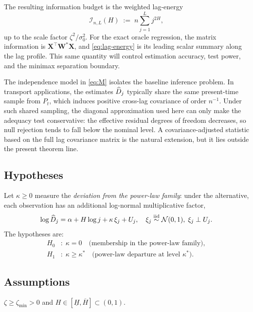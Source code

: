 The resulting information budget is the weighted lag-energy
\begin{equation}
    \mathcal I_{n,L}(H)
    \;:=\;
    n \sum_{j=1}^L j^{2H},
    \label{eq:lag-energy}
\end{equation}
up to the scale factor $\zeta^2/\sigma_0^2$.  For the exact oracle regression,
the matrix information is $\mathbf X^\top \mathbf W^* \mathbf X$, and
\eqref{eq:lag-energy} is its leading scalar summary along the lag profile.
This same quantity will control estimation accuracy, test power, and the
minimax separation boundary.

\begin{remark}
    The independence model in \eqref{eq:M} isolates the baseline inference
    problem.  In transport applications, the estimates $\widehat{D}_j$ typically share
    the same present-time sample from $P_t$, which induces positive cross-lag
    covariance of order $n^{-1}$.  Under such shared sampling, the diagonal
    approximation used here can only make the adequacy test conservative: the
    effective residual degrees of freedom decreases, so null rejection tends to
    fall below the nominal level.  A covariance-adjusted statistic based on the
    full lag covariance matrix is the natural extension, but it lies outside the
    present theorem line.
\end{remark}

\subsection{Hypotheses}

Let $\kappa \geq 0$ measure the \emph{deviation from the power-law family}: under the
alternative, each observation has an additional log-normal multiplicative
factor,
\[
    \log \widehat{D}_j = \alpha + H\log j + \kappa\,\xi_j + U_j,\quad
    \xi_j \overset{\text{iid}}{\sim} \mathcal{N}(0,1),\;\xi_j \perp U_j.
\]
The hypotheses are:
\begin{align*}
    H_0&:\; \kappa = 0 \quad\text{(membership in the power-law family)},\\
    H_1&:\; \kappa \geq \kappa^* \quad\text{(power-law departure at level } \kappa^*\text{)}.
\end{align*}

\subsection{Assumptions}

\begin{assumption}
\label{ass:signal}
$\zeta \geq \zeta_{\min} > 0$ and $H \in [\underline{H}, \overline{H}]
\subset (0,1)$.
\end{assumption}

